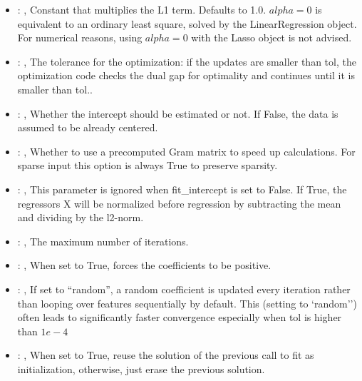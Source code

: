 \begin{itemize}
    \item {}: , 
      Constant that multiplies the L1 term. Defaults to 1.0.
      $alpha = 0$ is equivalent to an ordinary least square, solved by
      the LinearRegression object. For numerical reasons, using $alpha = 0$
      with the Lasso object is not advised.

    \item {}: , 
      The tolerance for the optimization: if the updates are smaller
      than tol, the optimization code checks the dual gap for optimality and
      continues until it is smaller than tol..

    \item {}: , 
      Whether the intercept should be estimated or not. If False,
      the data is assumed to be already centered.

    \item {}: , 
      Whether to use a precomputed Gram matrix to speed up calculations.
      For sparse input this option is always True to preserve sparsity.

    \item {}: , 
      This parameter is ignored when fit\_intercept is set to False. If True,
      the regressors X will be normalized before regression by subtracting the mean and
      dividing by the l2-norm.

    \item {}: , 
      The maximum number of iterations.

    \item {}: , 
      When set to True, forces the coefficients to be positive.

    \item {}: , 
      If set to ``random'', a random coefficient is updated every iteration
      rather than looping over features sequentially by default. This (setting to `random'')
      often leads to significantly faster convergence especially when tol is higher than $1e-4$

    \item {}: , 
      When set to True, reuse the solution of the previous call
      to fit as initialization, otherwise, just erase the previous solution.
  \end{itemize}


